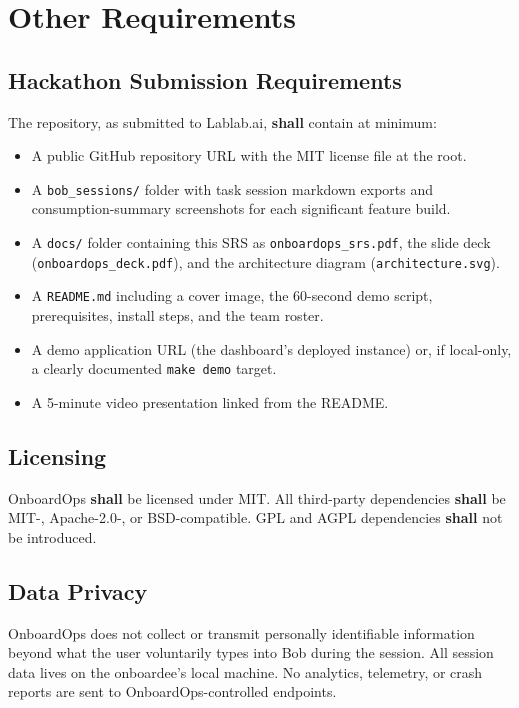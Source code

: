 \documentclass[11pt,letterpaper]{article}
\newcommand{\shall}{\textbf{shall}}
\begin{document}
\section{Other Requirements}

\subsection{Hackathon Submission Requirements}

The repository, as submitted to Lablab.ai, \shall{} contain at minimum:

\begin{itemize}
  \item A public GitHub repository URL with the MIT license file at the root.
  \item A \texttt{bob\_sessions/} folder with task session markdown exports and consumption-summary screenshots for each significant feature build.
  \item A \texttt{docs/} folder containing this SRS as \texttt{onboardops\_srs.pdf}, the slide deck (\texttt{onboardops\_deck.pdf}), and the architecture diagram (\texttt{architecture.svg}).
  \item A \texttt{README.md} including a cover image, the 60-second demo script, prerequisites, install steps, and the team roster.
  \item A demo application URL (the dashboard's deployed instance) or, if local-only, a clearly documented \texttt{make demo} target.
  \item A 5-minute video presentation linked from the README.
\end{itemize}

\subsection{Licensing}

OnboardOps \shall{} be licensed under MIT. All third-party dependencies \shall{} be MIT-, Apache-2.0-, or BSD-compatible. GPL and AGPL dependencies \shall{} not be introduced.

\subsection{Data Privacy}

OnboardOps does not collect or transmit personally identifiable information beyond what the user voluntarily types into Bob during the session. All session data lives on the onboardee's local machine. No analytics, telemetry, or crash reports are sent to OnboardOps-controlled endpoints.
\end{document}
